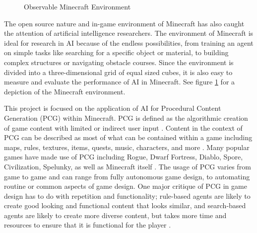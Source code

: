\documentclass[11pt, oneside]{article}
\begin{document}
\begin{normalsize}
\begin{figure}[H]%
    \centering
    \qquad
    \caption{Observable Minecraft Environment}%
    \label{fig:env}%
\end{figure}

The open source nature and in-game environment of Minecraft has also caught the attention of artificial intelligence researchers. The environment of Minecraft is ideal for research in AI because of the endless possibilities, from training an agent on simple tasks like searching for a specific object or material, to building complex structures or navigating obstacle courses. Since the environment is divided into a three-dimensional grid of equal sized cubes, it is also easy to measure and evaluate the performance of AI in Minecraft. See figure \ref{fig:env} for a depiction of the Minecraft environment.

This project is focused on the application of AI for Procedural Content Generation (PCG) within Minecraft. PCG is defined as the algorithmic creation of game content with limited or indirect user input \cite{shaker2016procedural}. Content in the context of PCG can be described as most of what can be contained within a game including maps, rules, textures, items, quests, music, characters, and more \cite{shaker2016procedural}. Many popular games have made use of PCG including Rogue, Dwarf Fortress, Diablo, Spore, Civilization, Spelunky, as well as Minecraft itself \cite{shaker2016procedural}. The usage of PCG varies from game to game and can range from fully autonomous game design, to  automating routine or common aspects of game design. One major critique of PCG in game design has to do with repetition and functionality; rule-based agents are likely to create good looking and functional content that looks similar, and search-based agents are likely to create more diverse content, but takes more time and resources to ensure that it is functional for the player \cite{green_organic_2019}.


\end{normalsize}
\end{document}
